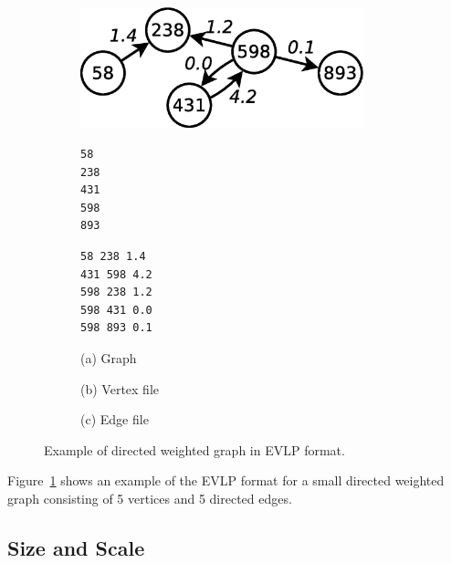 \begin{figure}[t!]
\centering
\begin{subfigure}{0.3\textwidth}
\includegraphics[width=0.9\textwidth]{figures/example_evlp}
\end{subfigure}
\begin{subfigure}{0.3\textwidth}
\begin{Verbatim}[frame=single]
58 
238
431
598
893
\end{Verbatim}
\end{subfigure}
\begin{subfigure}{0.3\textwidth}
\begin{Verbatim}[frame=single]
58 238 1.4
431 598 4.2
598 238 1.2
598 431 0.0
598 893 0.1
\end{Verbatim}
\end{subfigure}
\newline
\newline
\begin{subfigure}{0.3\textwidth}
  \centering
  (a) Graph
\end{subfigure}
\begin{subfigure}{0.3\textwidth}
  \centering
  (b) Vertex file
\end{subfigure}
\begin{subfigure}{0.3\textwidth}
  \centering
  (c) Edge file
\end{subfigure}

\caption{Example of directed weighted graph in EVLP format.}
\label{fig:definition_example_evlp}
\end{figure}

Figure~\ref{fig:definition_example_evlp} shows an example of the EVLP format for a small directed weighted graph consisting of 5 vertices and 5 directed edges.


\subsection{Size and Scale}
\label{sec:definition_scale}

